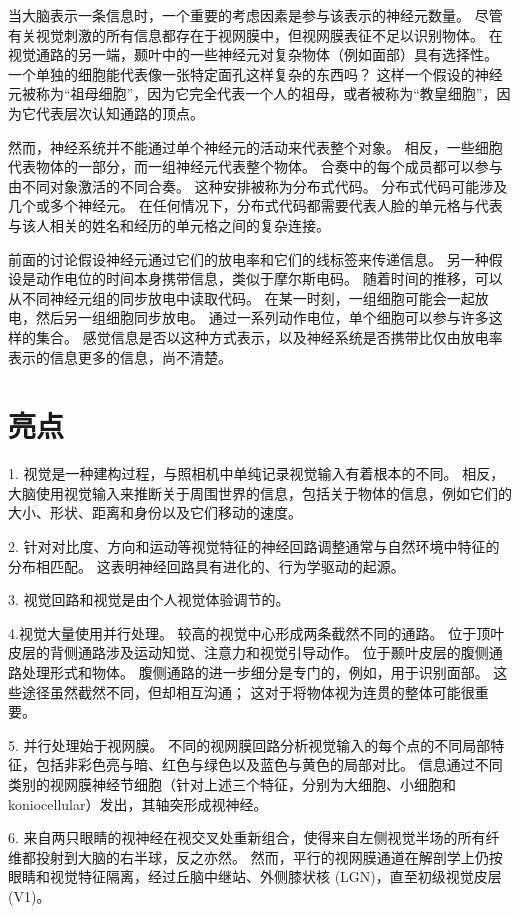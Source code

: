 当大脑表示一条信息时，一个重要的考虑因素是参与该表示的神经元数量。 
尽管有关视觉刺激的所有信息都存在于视网膜中，但视网膜表征不足以识别物体。 
在视觉通路的另一端，颞叶中的一些神经元对复杂物体（例如面部）具有选择性。 
一个单独的细胞能代表像一张特定面孔这样复杂的东西吗？ 
这样一个假设的神经元被称为“祖母细胞”，因为它完全代表一个人的祖母，或者被称为“教皇细胞”，因为它代表层次认知通路的顶点。


然而，神经系统并不能通过单个神经元的活动来代表整个对象。 
相反，一些细胞代表物体的一部分，而一组神经元代表整个物体。 
合奏中的每个成员都可以参与由不同对象激活的不同合奏。 
这种安排被称为分布式代码。 分布式代码可能涉及几个或多个神经元。 
在任何情况下，分布式代码都需要代表人脸的单元格与代表与该人相关的姓名和经历的单元格之间的复杂连接。


前面的讨论假设神经元通过它们的放电率和它们的线标签来传递信息。 
另一种假设是动作电位的时间本身携带信息，类似于摩尔斯电码。 
随着时间的推移，可以从不同神经元组的同步放电中读取代码。 
在某一时刻，一组细胞可能会一起放电，然后另一组细胞同步放电。 
通过一系列动作电位，单个细胞可以参与许多这样的集合。 
感觉信息是否以这种方式表示，以及神经系统是否携带比仅由放电率表示的信息更多的信息，尚不清楚。


\section{亮点}

1. 视觉是一种建构过程，与照相机中单纯记录视觉输入有着根本的不同。 
相反，大脑使用视觉输入来推断关于周围世界的信息，包括关于物体的信息，例如它们的大小、形状、距离和身份以及它们移动的速度。 


2. 针对对比度、方向和运动等视觉特征的神经回路调整通常与自然环境中特征的分布相匹配。 
这表明神经回路具有进化的、行为学驱动的起源。 


3. 视觉回路和视觉是由个人视觉体验调节的。 

4.视觉大量使用并行处理。 
较高的视觉中心形成两条截然不同的通路。 
位于顶叶皮层的背侧通路涉及运动知觉、注意力和视觉引导动作。 
位于颞叶皮层的腹侧通路处理形式和物体。 
腹侧通路的进一步细分是专门的，例如，用于识别面部。 
这些途径虽然截然不同，但却相互沟通； 这对于将物体视为连贯的整体可能很重要。
 

5. 并行处理始于视网膜。 
不同的视网膜回路分析视觉输入的每个点的不同局部特征，包括非彩色亮与暗、红色与绿色以及蓝色与黄色的局部对比。 
信息通过不同类别的视网膜神经节细胞（针对上述三个特征，分别为大细胞、小细胞和 koniocellular）发出，其轴突形成视神经。
 

6. 来自两只眼睛的视神经在视交叉处重新组合，使得来自左侧视觉半场的所有纤维都投射到大脑的右半球，反之亦然。 
然而，平行的视网膜通道在解剖学上仍按眼睛和视觉特征隔离，经过丘脑中继站、外侧膝状核 (LGN)，直至初级视觉皮层 (V1)。 


